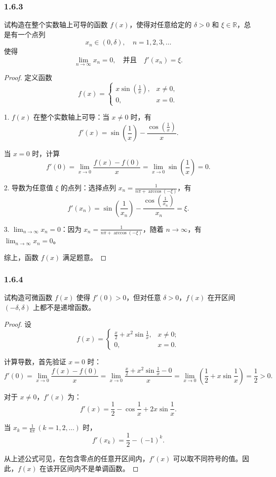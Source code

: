 \documentclass[12pt]{ctexart}
\begin{document}
\subsubsection*{1.6.3}

试构造在整个实数轴上可导的函数 $f(x)$，使得对任意给定的 $\delta > 0$ 和 $\xi \in \mathbb{R}$，总是有一个点列
\[
x_n \in (0, \delta), \quad n = 1, 2, 3, \dots
\]
使得
\[
\lim_{n \to \infty} x_n = 0, \quad \text{并且} \quad f'(x_n) = \xi.
\]
\begin{proof}
定义函数
\[
f(x) =
\begin{cases}
x \sin \left( \frac{1}{x} \right), & x \neq 0, \\
0, & x = 0.
\end{cases}
\]

1. $f(x)$ 在整个实数轴上可导：当 $x \neq 0$ 时，有
\[
f'(x) = \sin \left( \frac{1}{x} \right) - \frac{\cos \left( \frac{1}{x} \right)}{x}.
\]

当 $x = 0$ 时，计算
\[
f'(0) = \lim_{x \to 0} \frac{f(x) - f(0)}{x} = \lim_{x \to 0} \sin \left( \frac{1}{x} \right) = 0.
\]

2. 导数为任意值 $\xi$ 的点列：选择点列 $x_n = \frac{1}{n\pi + \arccos(-\xi)}$，有
\[
f'(x_n) = \sin \left( \frac{1}{x_n} \right) - \frac{\cos \left( \frac{1}{x_n} \right)}{x_n} = \xi.
\]

3. $\lim_{n \to \infty} x_n = 0$：因为 $x_n = \frac{1}{n\pi + \arccos(-\xi)}$，随着 $n \to \infty$，有 $\lim_{n \to \infty} x_n = 0$。

综上，函数 $f(x)$ 满足题意。
\end{proof}

\subsubsection*{1.6.4}

试构造可微函数 $f(x)$ 使得 $f'(0) > 0$，但对任意 $\delta > 0$，$f(x)$ 在开区间 $(-\delta, \delta)$ 上都不是递增函数。

\begin{proof}
设
\[
f(x) =
\begin{cases}
\frac{x}{2} + x^2 \sin \frac{1}{x}, & x \neq 0; \\
0, & x = 0.
\end{cases}
\]

计算导数，首先验证 $x = 0$ 时：
\[
f'(0) = \lim_{x \to 0} \frac{f(x) - f(0)}{x} = \lim_{x \to 0} \frac{\frac{x}{2} + x^2 \sin \frac{1}{x} - 0}{x}
= \lim_{x \to 0} \left( \frac{1}{2} + x \sin \frac{1}{x} \right) = \frac{1}{2} > 0.
\]

对于 $x \neq 0$，$f'(x)$ 为：
\[
f'(x) = \frac{1}{2} - \cos \frac{1}{x} + 2x \sin \frac{1}{x}.
\]

当 $x_k = \frac{1}{k\pi} \, (k = 1, 2, \dots)$ 时，
\[
f'(x_k) = \frac{1}{2} - (-1)^k.
\]

从上述公式可见，在包含零点的任意开区间内，$f'(x)$ 可以取不同符号的值。因此，$f(x)$ 在该开区间内不是单调函数。
\end{proof}
\end{document}
